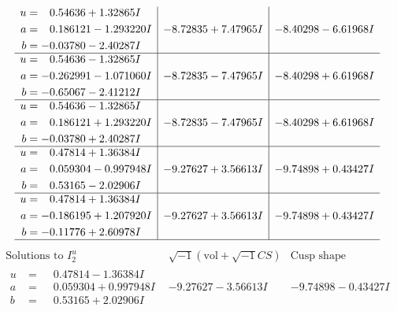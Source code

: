 \documentclass[1p]{elsarticle_modified}
\theoremstyle{definition}
\newcommand{\I}{\sqrt{-1}}
\begin{document}
$$\begin{array}{c|c|c}
\begin{aligned}
u &= \phantom{-}0.54636 + 1.32865 I \\
a &= \phantom{-}0.186121 - 1.293220 I \\
b &= -0.03780 - 2.40287 I\end{aligned}
 & -8.72835 + 7.47965 I & -8.40298 - 6.61968 I \\ \hline\begin{aligned}
u &= \phantom{-}0.54636 - 1.32865 I \\
a &= -0.262991 - 1.071060 I \\
b &= -0.65067 - 2.41212 I\end{aligned}
 & -8.72835 - 7.47965 I & -8.40298 + 6.61968 I \\ \hline\begin{aligned}
u &= \phantom{-}0.54636 - 1.32865 I \\
a &= \phantom{-}0.186121 + 1.293220 I \\
b &= -0.03780 + 2.40287 I\end{aligned}
 & -8.72835 - 7.47965 I & -8.40298 + 6.61968 I \\ \hline\begin{aligned}
u &= \phantom{-}0.47814 + 1.36384 I \\
a &= \phantom{-}0.059304 - 0.997948 I \\
b &= \phantom{-}0.53165 - 2.02906 I\end{aligned}
 & -9.27627 + 3.56613 I & -9.74898 + 0.43427 I \\ \hline\begin{aligned}
u &= \phantom{-}0.47814 + 1.36384 I \\
a &= -0.186195 + 1.207920 I \\
b &= -0.11776 + 2.60978 I\end{aligned}
 & -9.27627 + 3.56613 I & -9.74898 + 0.43427 I\\
 \hline 
 \end{array}$$\newpage$$\begin{array}{c|c|c}  
\text{Solutions to }I^u_{2}& \I (\text{vol} + \sqrt{-1}CS) & \text{Cusp shape}\\
 \hline 
\begin{aligned}
u &= \phantom{-}0.47814 - 1.36384 I \\
a &= \phantom{-}0.059304 + 0.997948 I \\
b &= \phantom{-}0.53165 + 2.02906 I\end{aligned}
 & -9.27627 - 3.56613 I & -9.74898 - 0.43427 I \\ \hline\begin{aligned}

\end{aligned}
\end{array}$$
\end{document}
